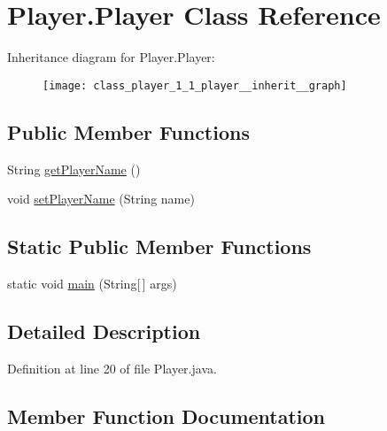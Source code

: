 \hypertarget{class_player_1_1_player}{}\section{Player.\+Player Class Reference}
\label{class_player_1_1_player}


Inheritance diagram for Player.\+Player\+:
\nopagebreak
\begin{figure}[H]
\begin{center}
\leavevmode
\texttt{[image: class\_player\_1\_1\_player\_\_inherit\_\_graph]}
\end{center}
\end{figure}
\subsection*{Public Member Functions}
\begin{DoxyCompactItemize}
\item 
String \hyperlink{class_player_1_1_player_ad8906c9e2ffb8388625575c6673e4b0b}{get\+Player\+Name} ()
\item 
void \hyperlink{class_player_1_1_player_ab3aeb1c66c6adb5c9a6581b5ab1707a2}{set\+Player\+Name} (String name)
\end{DoxyCompactItemize}
\subsection*{Static Public Member Functions}
\begin{DoxyCompactItemize}
\item 
static void \hyperlink{class_player_1_1_player_afb83f5bf48e6debe52a1e1bbe3e8fc51}{main} (String\mbox{[}$\,$\mbox{]} args)
\end{DoxyCompactItemize}


\subsection{Detailed Description}


Definition at line 20 of file Player.\+java.



\subsection{Member Function Documentation}
\hypertarget{class_player_1_1_player_ad8906c9e2ffb8388625575c6673e4b0b}{}
